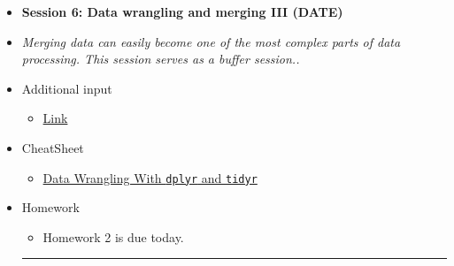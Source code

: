 \documentclass[12pt, a4paper]{article}
\begin{document}
\begin{itemize}
\item[] \textbf{Session 6: Data wrangling and merging III (DATE)} 
\item[]\textit{Merging data can easily become one of the most complex parts of data processing. This session serves as a buffer session..}
\item[] \faEdit \space Additional input
\begin{itemize} 
\item[$\square$] \href{url}{Link}
\end{itemize}
\item[] \faLightbulbO \space CheatSheet
\begin{itemize} 
\item[$\square$] \href{https://www.rstudio.com/wp-content/uploads/2015/02/data-wrangling-cheatsheet.pdf}{Data Wrangling With \texttt{dplyr} and \texttt{tidyr}}
\end{itemize}
\item[] \faExclamation \space Homework
\begin{itemize} 
\item[$\square$] Homework 2 is due today.
\end{itemize}

\vspace*{0.04in}
\noindent\rule{16cm}{0.7pt}
\vspace*{-0.45in}


\end{itemize}
\end{document}
